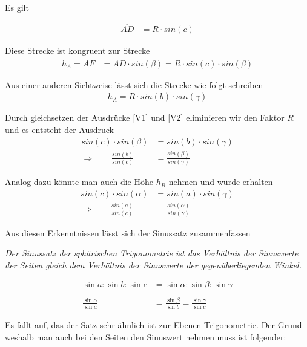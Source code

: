 \begin{refsection}
Es gilt

\begin{align*}
\overline{AD} &= R \cdot sin (c)
\end{align*}

Diese Strecke ist kongruent zur Strecke
\begin{align}
h_{A} = \overline{AF} &= \overline{AD} \cdot sin(\beta) = R \cdot sin(c) \cdot sin(\beta)  
\label {V1}
\end{align}

Aus einer anderen Sichtweise lässt sich die Strecke wie folgt schreiben
\begin{align}
h_{A} = R \cdot sin(b) \cdot sin(\gamma)  
\label {V2}
\end{align}

Durch gleichsetzen der Ausdrücke \eqref{V1} und \eqref{V2} eliminieren wir den Faktor $R$ und es entsteht der Ausdruck
\begin{align*}
sin(c) \cdot sin(\beta) &= sin(b) \cdot sin(\gamma) \\
\Rightarrow \quad \quad
\frac{sin (b)}{sin (c)} &= \frac{sin (\beta)}{sin (\gamma)}
\end{align*}

Analog dazu könnte man auch die Höhe $h_{B}$ nehmen und würde erhalten
\begin{align*}
sin(c) \cdot sin(\alpha) &= sin(a) \cdot sin(\gamma) \\
\Rightarrow \quad \quad
\frac{sin (a)}{sin (c)} &= \frac{sin (\alpha)}{sin (\gamma)}
\end{align*}

Aus diesen Erkenntnissen lässt sich der Sinussatz zusammenfassen
\begin{satz}\textit{Der Sinussatz der sphärischen Trigonometrie ist das Verhältnis der Sinuswerte der Seiten gleich dem Verhältnis der Sinuswerte der gegenüberliegenden Winkel.}
\label{skript:kugel:satz:Sinussatz}
\end{satz}

\begin{align*}
\sin a : \sin b : \sin c &= \sin \alpha : \sin \beta : \sin \gamma \\
 \\
\frac{\sin \alpha}{\sin a} &= \frac{\sin \beta}{\sin b} = \frac{\sin \gamma}{\sin c}
\end{align*} 

Es fällt auf, das der Satz sehr ähnlich ist zur Ebenen Trigonometrie. Der Grund weshalb man auch bei den Seiten den Sinuswert nehmen muss ist folgender:


\end{refsection}
